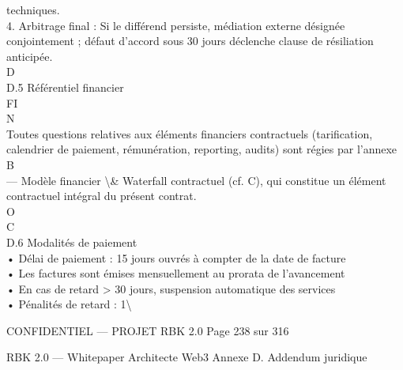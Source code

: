 techniques.\\
\vspace{0.5em}
4. Arbitrage final : Si le différend persiste, médiation externe désignée conjointement ; défaut d’accord sous 30 jours déclenche clause de résiliation anticipée.\\
\vspace{0.5em}
\vspace{0.5em}
\vspace{0.5em}
\vspace{0.5em}
D\\
D.5 Référentiel financier\\
FI\\
N\\
Toutes questions relatives aux éléments financiers contractuels (tarification, calendrier de paiement, rémunération, reporting, audits) sont régies par l’annexe B\\
— Modèle financier \textbackslash{}& Waterfall contractuel (cf. C), qui constitue un élément contractuel intégral du présent contrat.\\
O\\
C\\
\vspace{0.5em}
\vspace{0.5em}
D.6 Modalités de paiement\\
• Délai de paiement : 15 jours ouvrés à compter de la date de facture\\
\vspace{0.5em}
• Les factures sont émises mensuellement au prorata de l’avancement\\
\vspace{0.5em}
• En cas de retard \textgreater{} 30 jours, suspension automatique des services\\
\vspace{0.5em}
• Pénalités de retard : 1\textbackslash{}%
\vspace{0.5em}
\vspace{0.5em}
\vspace{0.5em}
\begin{confidential}CONFIDENTIEL — PROJET RBK 2.0                                              Page 238 sur 316\end{confidential}
RBK 2.0 — Whitepaper Architecte Web3                                                                                           Annexe D. Addendum juridique\\
\vspace{0.5em}
